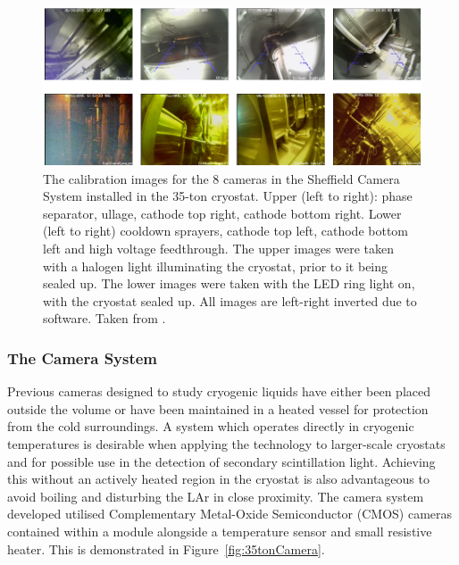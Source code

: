 \begin{figure}
  \centering
  \includegraphics[width=15cm]{35tonCamerasImages.pdf}
  \caption[The calibration images for the 8 cameras in the Sheffield Camera System installed in the 35-ton cryostat.]{The calibration images for the 8 cameras in the Sheffield Camera System installed in the 35-ton cryostat.  Upper (left to right): phase separator, ullage, cathode top right, cathode bottom right.  Lower (left to right) cooldown sprayers, cathode top left, cathode bottom left and high voltage feedthrough.  The upper images were taken with a halogen light illuminating the cryostat, prior to it being sealed up.  The lower images were taken with the LED ring light on, with the cryostat sealed up. All images are left-right inverted due to software.  Taken from \cite{35tonCameras2017}.}
  \label{fig:35tonCamerasImages}
\end{figure}

\subsubsection{The Camera System}\label{sec:35tonCameraSystem}

Previous cameras designed to study cryogenic liquids have either been placed outside the volume or have been maintained in a heated vessel for protection from the cold surroundings.  A system which operates directly in cryogenic temperatures is desirable when applying the technology to larger-scale cryostats and for possible use in the detection of secondary scintillation light.  Achieving this without an actively heated region in the cryostat is also advantageous to avoid boiling and disturbing the LAr in close proximity.  The camera system developed utilised Complementary Metal-Oxide Semiconductor (CMOS) cameras contained within a module alongside a temperature sensor and small resistive heater.  This is demonstrated in Figure~\ref{fig:35tonCamera}.


